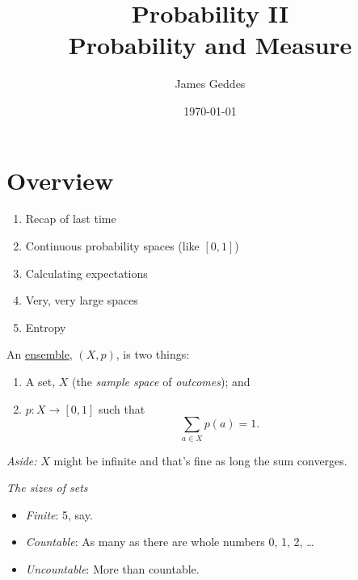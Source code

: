\documentclass[11pt]{article}
\author{James Geddes}
\date{\today}
\title{Probability II\\ {\normalsize Probability and Measure}}
\begin{document}
\setcounter{page}{0}
\maketitle\thispagestyle{empty}
\restoregeometry
\newpage
\section*{Overview}
\label{slide:recap}
\begin{enumerate}
\item Recap of last time
\item Continuous probability spaces (like $[0,1]$)
\item Calculating expectations
\item Very, very large spaces
\item Entropy
\end{enumerate}
\hrulefill

An \ul{ensemble}, $(X, p)$, is two things:
\begin{enumerate}
\item A set, $X$ (the \emph{sample space} of \emph{outcomes}); and
\item $p : X \to [0,1]$ such that
  \[
  \sum_{a \in X} p(a) = 1.
  \]
\end{enumerate}
\emph{Aside:} $X$ might be infinite and that's fine as long the sum
converges.

\hrulefill

\emph{The sizes of sets}
\begin{itemize}
\item \emph{Finite}: 5, say.
\item \emph{Countable}: As many as there are whole numbers 0, 1, 2, \ldots
\item \emph{Uncountable}: More than countable.
\end{itemize}
\medskip
\end{document}
